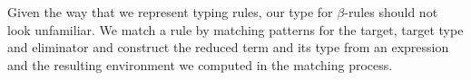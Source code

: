 {\begin{code}
\AgdaSpace{}%
\AgdaSpace{}%
\AgdaSpace{}%
\AgdaSymbol{(}\AgdaSymbol{;}\AgdaSpace{}%
\AgdaInductiveConstructor{[]}\AgdaSymbol{;}\AgdaSpace{}%
\AgdaSymbol{)}\<%
\\
\>[0]\AgdaSpace{}%
\AgdaSpace{}%
\AgdaSpace{}%
\AgdaSpace{}%
\AgdaSymbol{(}\AgdaSymbol{;}\AgdaSpace{}%
\AgdaSymbol{;}\AgdaSpace{}%
\AgdaSymbol{)}\<%
\\
\>[0]\AgdaSpace{}%
\AgdaSpace{}%
\AgdaSpace{}%
\AgdaSpace{}%
\AgdaSymbol{(}\AgdaOperator{\AgdaFunction{\AgdaUnderscore{}>>=\AgdaUnderscore{}}}\AgdaSymbol{)}\<%
\end{code}
}


Given the way that we represent typing rules, our type for $β$-rules
should not look unfamiliar. We match a rule by matching patterns for the
target, target type and eliminator and construct the reduced term
and its type from an expression and the resulting environment we
computed in the matching process.

